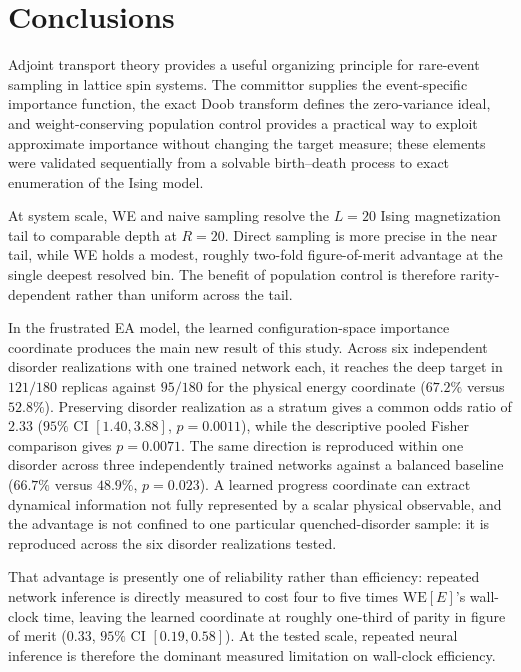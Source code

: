 \documentclass[a4paper,fleqn]{cas-sc}
\newcommand{\WE}{\mathrm{WE}}
\begin{document}
\FloatBarrier

\section{Conclusions}\label{sec:conclusions}

Adjoint transport theory provides a useful organizing principle for rare-event sampling in
lattice spin systems. The committor supplies the event-specific importance function, the exact
Doob transform defines the zero-variance ideal, and weight-conserving population control
provides a practical way to exploit approximate importance without changing the target
measure; these elements were validated sequentially from a solvable birth--death process to
exact enumeration of the Ising model.

At system scale, WE and naive sampling resolve the $L=20$ Ising magnetization tail to
comparable depth at $R=20$. Direct sampling is more precise in the near tail, while WE holds a
modest, roughly two-fold figure-of-merit advantage at the single deepest resolved bin. The
benefit of population control is therefore rarity-dependent rather than uniform across the
tail.

In the frustrated EA model, the learned configuration-space importance coordinate produces the
main new result of this study. Across six independent disorder realizations with one trained
network each, it reaches the deep target in $121/180$ replicas against $95/180$ for the physical
energy coordinate ($67.2\%$ versus $52.8\%$).  Preserving disorder realization as a stratum
gives a common odds ratio of $2.33$ ($95\%$ CI $[1.40,3.88]$, $p=0.0011$), while the descriptive
pooled Fisher comparison gives $p=0.0071$.  The same direction is reproduced within one disorder
across three independently trained networks against a balanced baseline ($66.7\%$ versus
$48.9\%$, $p=0.023$).  A learned progress coordinate can extract dynamical information not
fully represented by a scalar physical observable, and the advantage is not confined to one
particular quenched-disorder sample: it is reproduced across the six disorder realizations
tested.

That advantage is presently one of reliability rather than efficiency: repeated network
inference is directly measured to cost four to five times $\WE[E]$'s wall-clock time, leaving
the learned coordinate at roughly one-third of parity in figure of merit ($0.33$, $95\%$ CI
$[0.19,0.58]$). At the tested scale, repeated neural inference is therefore the dominant measured
limitation on wall-clock efficiency.
\end{document}
